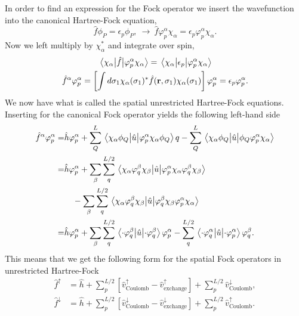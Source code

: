 In order to find an expression for the Fock operator we insert the wavefunction into the 
canonical Hartree-Fock equation,
\begin{equation}
    \hat{f}\phi_P = \epsilon_p\phi_P, \ \to \ 
    \hat{f}\varphi_p^\alpha \chi_\alpha = \epsilon_p\varphi_p^\alpha \chi_\alpha. 
\end{equation}
Now we left multiply by $\chi_\alpha^*$ and integrate over spin,
\begin{gather}
    \mel{\chi_\alpha}{\hat{f}}{\varphi_p^\alpha\chi_\alpha}
    = \mel{\chi_\alpha}{\epsilon_p}{\varphi_p^\alpha\chi_\alpha} \\
    \hat{f}^\alpha \varphi_p^\alpha
    = \left[ 
        \int d\sigma_1 \chi_\alpha(\sigma_1)^*\hat{f}(\vb{r}, \sigma_1)\chi_\alpha(\sigma_1)     
    \right] \varphi_p^\alpha
    = \epsilon_p\varphi_p^\alpha.
\end{gather}
We now have what is called the spatial unrestricted Hartree-Fock equations. Inserting for 
the canonical Fock operator yields the following left-hand side
\begin{equation}
    \begin{aligned}
        \hat{f}^\alpha\varphi_p^\alpha 
        =& \hat{h}\varphi_p^\alpha 
        + \sum_Q^L \mel{\chi_\alpha \phi_Q}{\hat{u}}{\varphi_p^\alpha\chi_\alpha\phi_Q}q
        - \sum_Q^L \mel{\chi_\alpha \phi_Q}{\hat{u}}{\phi_Q\varphi_p^\alpha\chi_\alpha} \\
        =& \hat{h}\varphi_p^\alpha
        + \sum_\beta \sum_q^{L/2}
            \mel{\chi_\alpha\varphi^\beta_q\chi_\beta}{\hat{u}}{\varphi^\alpha_p\chi_\alpha\varphi^\beta_q\chi_\beta} \\
        & \quad - \sum_\beta \sum_q^{L/2}
            \mel{\chi_\alpha\varphi^\beta_q\chi_\beta}{\hat{u}}{\varphi^\beta_q\chi_\beta\varphi^\alpha_p\chi_\alpha} \\
        =& \hat{h} \varphi_p^\alpha
        + \sum_\beta \sum_q^{L/2}
            \mel{\cdot\varphi_q^\beta}{\hat{u}}{\cdot\varphi_q^\beta}\varphi_p^\alpha
        - \sum_q^{L/2}
            \mel{\cdot\varphi_q^\alpha}{\hat{u}}{\cdot\varphi_p^\alpha}\varphi_q^\beta.
    \end{aligned}
\end{equation} 
This means that we get the following form for the spatial Fock operators in unrestricted Hartree-Fock 
\begin{align}
\label{eq:fock_up_uhf}
\hat{f}^\uparrow &= 
    \hat{h} + \sum_p^{L/2}[\hat{v}^\uparrow_{\text{Coulomb}} - \hat{v}^\uparrow_{\text{exchange}}]
    + \sum_p^{L/2}\hat{v}^\downarrow_{\text{Coulomb}},  \\
\label{eq:fock_down_uhf}
\hat{f}^\downarrow &= 
    \hat{h} + \sum_p^{L/2}[\hat{v}^\downarrow_{\text{Coulomb}} - \hat{v}^\downarrow_{\text{exchange}}]
    + \sum_p^{L/2}\hat{v}^\uparrow_{\text{Coulomb}}.
\end{align}
